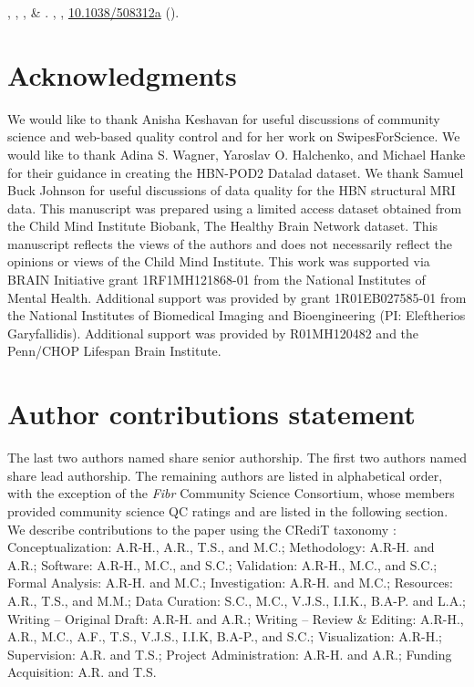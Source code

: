 \documentclass[fleqn,10pt,inline]{wlscirep}
\begin{document}
\begin{thebibliography}{100}
, ,
  ,  \&
\newblock {}.
 \textbf{},
  , \url{10.1038/508312a} ().

\end{thebibliography}

% 

\section*{Acknowledgments}

We would like to thank Anisha Keshavan for useful discussions of community
science and web-based quality control and for her work on SwipesForScience.
We would like to thank Adina S. Wagner, Yaroslav O. Halchenko, and Michael Hanke for their guidance in creating the HBN-POD2 Datalad dataset.
We thank Samuel Buck Johnson for useful discussions of data quality for the HBN structural MRI data.
This manuscript was prepared using a limited access dataset obtained from the Child
Mind Institute Biobank, The Healthy Brain Network dataset. This manuscript
reflects the views of the authors and does not necessarily reflect the opinions
or views of the Child Mind Institute. This work was supported via BRAIN Initiative grant 1RF1MH121868-01 from the National Institutes of Mental Health. Additional support was provided by grant 1R01EB027585-01 from the National Institutes of Biomedical Imaging and Bioengineering (PI: Eleftherios Garyfallidis). Additional support was provided by R01MH120482 and the Penn/CHOP Lifespan Brain Institute. 

\section*{Author contributions statement}

The last two authors named share senior authorship. The first two authors named
share lead authorship. The remaining authors are listed in alphabetical order,
with the exception of the \emph{Fibr} Community Science Consortium, whose members
provided community science QC ratings and are listed in the following section.
We describe contributions to the paper using the CRediT taxonomy \cite{brand2015-vd,allen2014-oc}:
Conceptualization: A.R-H., A.R., T.S., and M.C.;
Methodology: A.R-H. and A.R.;
Software: A.R-H., M.C., and S.C.;
Validation: A.R-H., M.C., and S.C.;
Formal Analysis: A.R-H. and M.C.;
Investigation: A.R-H. and M.C.;
Resources: A.R., T.S., and M.M.;
Data Curation: S.C., M.C., V.J.S., I.I.K., B.A-P. and L.A.;
Writing – Original Draft: A.R-H. and A.R.;
Writing – Review \& Editing: A.R-H., A.R., M.C., A.F., T.S., V.J.S., I.I.K, B.A-P., and S.C.;
Visualization: A.R-H.;
Supervision: A.R. and T.S.;
Project Administration: A.R-H. and A.R.;
Funding Acquisition: A.R. and T.S.
\end{document}

